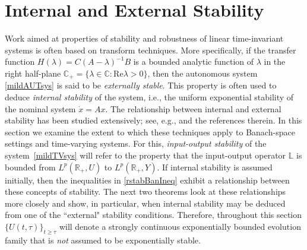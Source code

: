 \documentclass[10pt,psamsfonts,leqno]{siamltex}
\newcommand{\bbC}{\mathbb{C}}
\newcommand{\bbR}{\mathbb{R}}
\newcommand{\bbL}{\mathbb{L}}
\begin{document}
\section{Internal and External Stability}

Work aimed at properties of stability and robustness of linear
time-invariant systems is often based on transform techniques.
More specifically, if the  transfer
function $H(\lambda)=C(A-\lambda)^{-1}B$ is a bounded analytic function
of
$\lambda$ in the right half-plane $\bbC_+=\{\lambda\in\bbC:\mbox{Re
}\lambda>0\}$, then the autonomous system
\eqref{mildAUTsys} is said to be {\em externally stable}.  This property
is often used to deduce {\em internal stability} of the system, i.e.,
the uniform exponential stability of the nominal system $\dot x=Ax$.
The relationship between internal and external stability has been
studied
extensively; see, e.g.,
\cite{And2, Cur, Cur2, JacNet, Log, Reb1, Reb2} and the references
therein.  In this section we examine the extent to which these
techniques apply to Banach-space settings and time-varying systems.  For
this, {\em input-output stability} of the system~\eqref{mildTVsys} will
refer to the property that the input-output operator $\bbL$ is  bounded
 from $L^p(\bbR_+,U)$ to $L^p(\bbR_+,Y)$.
If internal stability is assumed initially, then the
inequalities in \eqref{rstabBanIneq} exhibit a relationship between
these concepts of stability.
The next two theorems look at these relationships more closely and show,
in particular, when internal stability may be deduced from one of the
``external" stability conditions.  Therefore, throughout this section
$\{U(t,\tau)\}_{t\ge\tau}$ will denote a strongly continuous
exponentially bounded evolution family that is {\em not} assumed to be
exponentially stable.
\end{document}
